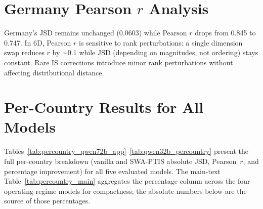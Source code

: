 \documentclass{article}
\begin{document}
\section{Germany Pearson $r$ Analysis}
\label{app:germany}

Germany's JSD remains unchanged (0.0603) while Pearson $r$ drops from 0.845 to 0.747.
In 6D, Pearson $r$ is sensitive to rank perturbations: a single dimension swap reduces
$r$ by $\sim$0.1 while JSD (depending on magnitudes, not ordering) stays constant.
Rare IS corrections introduce minor rank perturbations without affecting
distributional distance.

\section{Per-Country Results for All Models}
\label{app:percountry_all}
\label{app:percountry_qwen72b}
\label{app:percountry_qwen32b}

Tables~\ref{tab:percountry_qwen72b_app}--\ref{tab:qwen32b_percountry} present
the full per-country breakdown (vanilla and SWA-PTIS absolute JSD,
Pearson~$r$, and percentage improvement) for all five evaluated models. The
main-text Table~\ref{tab:percountry_main} aggregates the percentage column
across the four operating-regime models for compactness; the absolute
numbers below are the source of those percentages.
\end{document}
